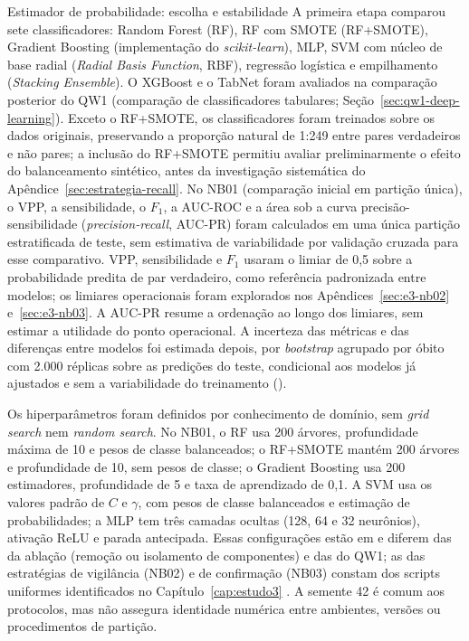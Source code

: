 \begin{chapter}{Estimador de probabilidade: escolha e estabilidade}
A primeira etapa comparou sete classificadores: Random Forest (RF), RF com SMOTE (RF+SMOTE), Gradient Boosting (implementação do \textit{scikit-learn}), MLP, SVM com núcleo de base radial (\textit{Radial Basis Function}, RBF), regressão logística e empilhamento (\textit{Stacking Ensemble}). O XGBoost e o TabNet \cite{Arik2021tabnet} foram avaliados na comparação posterior do QW1 (comparação de classificadores tabulares; Seção~\ref{sec:qw1-deep-learning}). Exceto o RF+SMOTE, os classificadores foram treinados sobre os dados originais, preservando a proporção natural de 1:249 entre pares verdadeiros e não pares; a inclusão do RF+SMOTE permitiu avaliar preliminarmente o efeito do balanceamento sintético, antes da investigação sistemática do Apêndice~\ref{sec:estrategia-recall}. No NB01 (comparação inicial em partição única), o VPP, a sensibilidade, o $F_1$, a AUC-ROC e a área sob a curva precisão-sensibilidade (\textit{precision-recall}, AUC-PR) foram calculados em uma única partição estratificada de teste, sem estimativa de variabilidade por validação cruzada para esse comparativo. VPP, sensibilidade e $F_1$ usaram o limiar de 0,5 sobre a probabilidade predita de par verdadeiro, como referência padronizada entre modelos; os limiares operacionais foram explorados nos Apêndices~\ref{sec:e3-nb02} e~\ref{sec:e3-nb03}. A AUC-PR resume a ordenação ao longo dos limiares, sem estimar a utilidade do ponto operacional. A incerteza das métricas e das diferenças entre modelos foi estimada depois, por \textit{bootstrap} agrupado por óbito com 2.000 réplicas sobre as predições do teste, condicional aos modelos já ajustados e sem a variabilidade do treinamento ().

Os hiperparâmetros foram definidos por conhecimento de domínio, sem \textit{grid search} nem \textit{random search}. No NB01, o RF usa 200 árvores, profundidade máxima de 10 e pesos de classe balanceados; o RF+SMOTE mantém 200 árvores e profundidade de 10, sem pesos de classe; o Gradient Boosting usa 200 estimadores, profundidade de 5 e taxa de aprendizado de 0,1. A SVM usa os valores padrão de $C$ e $\gamma$, com pesos de classe balanceados e estimação de probabilidades; a MLP tem três camadas ocultas (128, 64 e 32 neurônios), ativação ReLU e parada antecipada. Essas configurações estão em  e diferem das da ablação (remoção ou isolamento de componentes) e das do QW1; as das estratégias de vigilância (NB02) e de confirmação (NB03) constam dos scripts uniformes identificados no Capítulo~\ref{cap:estudo3} \cite{Jardim2026phdrepo}. A semente 42 é comum aos protocolos, mas não assegura identidade numérica entre ambientes, versões ou procedimentos de partição.


\end{chapter}
